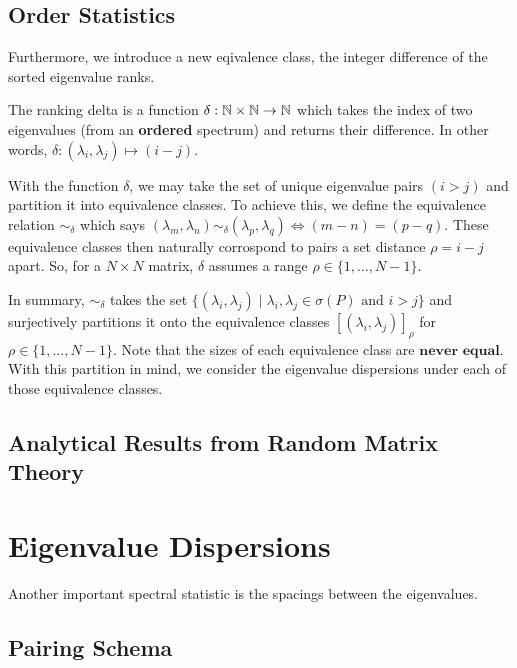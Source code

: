 \subsection{Order Statistics}

Furthermore, we introduce a new eqivalence class, the integer difference of the sorted eigenvalue ranks.

\begin{definition}
The ranking delta is a function $\delta: \mathbb{N} \times \mathbb{N} \to \mathbb{N}$ which takes the index of two eigenvalues (from an \textbf{ordered} spectrum) and returns their difference. In other words, $\delta : (\lambda_i,\lambda_j) \mapsto (i - j)$.
\end{definition}

With the function $\delta$, we may take the set of unique eigenvalue pairs $(i > j)$ and partition it into equivalence classes. To achieve this, we define the equivalence relation $\sim_\delta$ which says $(\lambda_m,\lambda_n) \sim_\delta (\lambda_p,\lambda_q) \iff (m -n) = (p-q)$. These equivalence classes then naturally corrospond to pairs a set distance $\rho = i - j$ apart. So, for a $N \times N$ matrix, $\delta$ assumes a range $\rho \in \{ 1,\dots,N-1\}$.

In summary, $\sim_\delta$ takes the set $\{(\lambda_i, \lambda_j) \mid \lambda_i, \lambda_j \in \sigma(P) \text{ and } i > j \}$ and surjectively partitions it onto the equivalence classes $[(\lambda_i, \lambda_j)]_\rho$ for $\rho \in \{ 1,\dots,N-1\}$. Note that the sizes of each equivalence class are $\textbf{never equal}$. With this partition in mind, we consider the eigenvalue dispersions under each of those equivalence classes.


\subsection{Analytical Results from Random Matrix Theory}

\section{Eigenvalue Dispersions}

Another important spectral statistic is the spacings between the eigenvalues.


\subsection{Pairing Schema}

